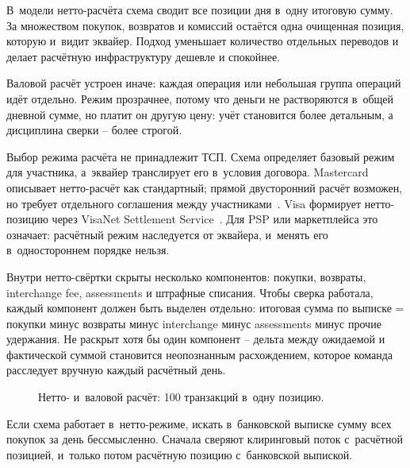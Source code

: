 В~модели нетто-расчёта схема сводит все позиции дня в~одну итоговую
сумму. За множеством покупок, возвратов и комиссий остаётся одна
очищенная позиция, которую и~видит эквайер. Подход уменьшает
количество отдельных переводов и делает расчётную инфраструктуру дешевле и спокойнее.

Валовой расчёт устроен иначе: каждая операция или небольшая группа
операций идёт отдельно. Режим прозрачнее, потому что деньги не
растворяются в~общей дневной сумме, но платит он другую цену:
учёт становится более детальным, а дисциплина сверки -- более строгой.

Выбор режима расчёта не принадлежит ТСП. Схема определяет
базовый режим для участника, а~эквайер транслирует его в~условия
договора. Mastercard описывает нетто-расчёт как стандартный; прямой
двусторонний расчёт возможен, но требует отдельного соглашения между
участниками~\cite{mc-rules}. Visa формирует нетто-позицию через
VisaNet Settlement Service~\cite{visa-core-rules}. Для PSP или
маркетплейса это означает: расчётный режим наследуется от
эквайера, и~менять его в~одностороннем порядке нельзя.

Внутри нетто-свёртки скрыты несколько компонентов: покупки, возвраты,
interchange fee, assessments и штрафные списания. Чтобы сверка
работала, каждый компонент должен быть выделен отдельно: итоговая
сумма по выписке = покупки минус возвраты минус interchange минус
assessments минус прочие удержания. Не раскрыт хотя бы один компонент --
дельта между ожидаемой и фактической суммой становится
неопознанным расхождением, которое команда расследует вручную каждый
расчётный день.

\begin{figure}[tbp]
  \centering
  \caption{Нетто- и~валовой расчёт: 100 транзакций в~одну позицию.}\label{fig:net-vs-gross}
\end{figure}

Если схема работает в~нетто-режиме,
искать в~банковской выписке сумму всех покупок за день бессмысленно.
Сначала сверяют клиринговый поток с~расчётной позицией, и~только потом
расчётную позицию с~банковской выпиской.

